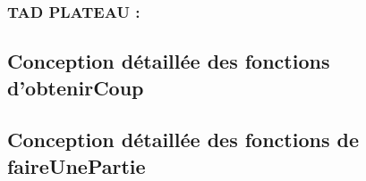 \documentclass{article}
\begin{document}
\subsubsection{TAD PLATEAU :}


\subsection{Conception détaillée des fonctions d'obtenirCoup}


\subsection{Conception détaillée des fonctions de faireUnePartie}

\end{document}
